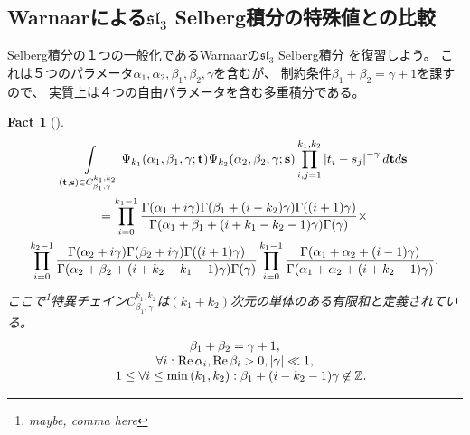 \documentclass[12pt,a4paper,dvipdfmx]{jsarticle}
\numberwithin{equation}{section}
\newcommand{\myre}[1]{\tmop{Re} #1}
\newcommand{\bolds}{\mathbf{s}}
\newcommand{\nin}{\not\in}
\newcommand{\tmop}[1]{\ensuremath{\operatorname{#1}}}
\theoremstyle{jplain}
\newtheorem{fact}[thm]{Fact}
\theoremstyle{remark}
\theoremstyle{definition}
\newcommand{\doubt}[1]{\fbox{#1}}
\begin{document}
		\subsection{Warnaarによる$\mathfrak{sl}_3$ Selberg積分の特殊値との比較}
		Selberg積分の１つの一般化であるWarnaarの$\mathfrak{sl}_3$ Selberg積分
		\cite{warnaar2010sl3}を復習しよう。
		これは５つのパラメータ$\alpha_1,\alpha_2,\beta_1,\beta_2,\gamma$を含むが、
		制{約}条件$\beta_1+\beta_2=\gamma+1$を課すので、
		実質上は４つの自由パラメータを含む多重積分である。
		\begin{fact}[{\cite[(1.4)]{warnaar2010sl3}}]
			\begin{multline}
				\displaystyle\int
				\displaylimits_{(\boldt,\bolds)\in C_{\beta_1,\gamma}^{k_1,k_2}}
				\Psi_{k_1}(\alpha_1,\beta_1,\gamma;\boldt)
				\Psi_{k_2}(\alpha_2,\beta_2,\gamma;\mathbf{s})
				\displaystyle\prod_{i,j=1}^{k_1,k_2}\myabs{t_i-s_j}^{-\gamma}
				d\boldt
				d\mathbf{s}\\
  = \displaystyle\prod_{i = 0}^{k_1 - 1} \frac{\Gamma (\alpha_1 + i \gamma) \Gamma (\beta_1
  + (i - k_2) \gamma) \Gamma ((i + 1) \gamma)}{\Gamma (\alpha_1 + \beta_1 + (i
  + k_1 - k_2 - 1) \gamma) \Gamma (\gamma)} \times\\
  \displaystyle\prod_{i = 0}^{k_2 - 1} \frac{\Gamma (\alpha_2 + i \gamma) \Gamma (\beta_2 +
  i \gamma) \Gamma ((i + 1) \gamma)}{\Gamma (\alpha_2 + \beta_2 + (i + k_2 -
  k_1 - 1) \gamma) \Gamma (\gamma)} \displaystyle\prod_{i = 0}^{k_1 - 1} \frac{\Gamma
  (\alpha_1 + \alpha_2 + (i - 1) \gamma)}{\Gamma (\alpha_1 + \alpha_2 + (i +
  k_2 - 1) \gamma)}.
  \end{multline}
  ここで\footnote{maybe, comma here}特異チェイン$C^{k_1,k_2}_{\beta_1,\gamma}$は$(k_1+k_2)$次元の単体のある有限和と\doubt{して}定義されている。
		\begin{equation*}
			\begin{array}{c}
					  \beta_1 + \beta_2 = \gamma + 1,\\
					    \forall i:
					    \myre{\alpha_i}, \myre{\beta_i} > 0,
					    \myabs{\gamma} \ll 1 ,\\ \quad 1
						\le \forall i \le \displaystyle\min\left( k_1,k_2 \right) : \beta_1 + (i - k_2 - 1)
						  \gamma \nin \mathbb{Z}.
			\end{array}
			\end{equation*}
			\end{fact}
\end{document}
